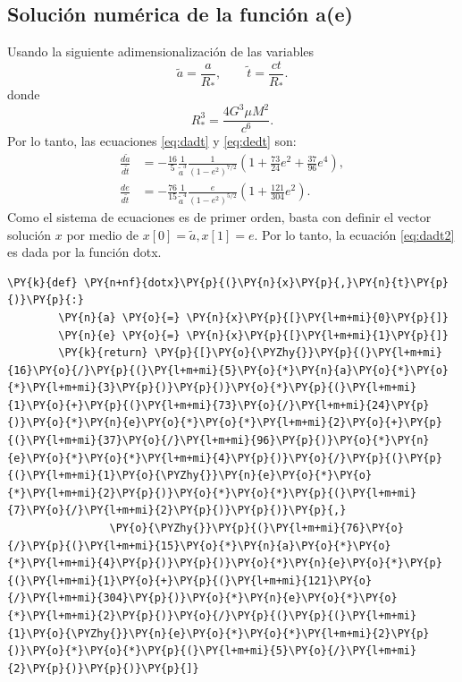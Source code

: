 \subsection{Solución numérica de la función a(e)}
Usando la siguiente adimensionalización \cite{Vito2008,Gonzalez2018,Gonz2019} de las variables
\begin{equation*}
    \tilde{a}= \frac{a}{R_*}, \qquad  \tilde{t}=\frac{ct}{R_*}.
\end{equation*}
donde
\begin{equation*}
    R_*^3 = \frac{4G^3\mu M^2}{c^6}.
\end{equation*}
Por lo tanto, las ecuaciones \ref{eq:dadt} y \ref{eq:dedt} son:
\begin{align}
    \label{eq:dadt2}
    \frac{d\tilde{a}}{d\tilde{t}} &= -\frac{16}{5}\frac{1}{\tilde{a}^3}\frac{1}{\left(1-e^2\right)^{7/2}}\left(1+\frac{73}{24}e^2+\frac{37}{96}e^4\right) ,\\
    \label{eq:dedt2}
\frac{de}{d\tilde{t}} &= -\frac{76}{15}\frac{1}{\tilde{a}^4}\frac{e}{\left(1-e^2\right)^{5/2}}\left(1+\frac{121}{304}e^2\right) .
\end{align}
Como el sistema de ecuaciones es de primer orden, basta con definir el vector solución $x$ por medio de $x[0]=\tilde{a}, x[1]=e$. Por lo tanto, 
la ecuación \ref{eq:dadt2} es dada por la función \textcolor{def}{dotx}.
\begin{tcolorbox}[breakable, size=fbox, boxrule=1pt, pad at break*=1mm,colback=cellbackground, colframe=cellborder]
    \begin{Verbatim}[commandchars=\\\{\}]
    \PY{k}{def} \PY{n+nf}{dotx}\PY{p}{(}\PY{n}{x}\PY{p}{,}\PY{n}{t}\PY{p}{)}\PY{p}{:}
        \PY{n}{a} \PY{o}{=} \PY{n}{x}\PY{p}{[}\PY{l+m+mi}{0}\PY{p}{]}
        \PY{n}{e} \PY{o}{=} \PY{n}{x}\PY{p}{[}\PY{l+m+mi}{1}\PY{p}{]}
        \PY{k}{return} \PY{p}{[}\PY{o}{\PYZhy{}}\PY{p}{(}\PY{l+m+mi}{16}\PY{o}{/}\PY{p}{(}\PY{l+m+mi}{5}\PY{o}{*}\PY{n}{a}\PY{o}{*}\PY{o}{*}\PY{l+m+mi}{3}\PY{p}{)}\PY{p}{)}\PY{o}{*}\PY{p}{(}\PY{l+m+mi}{1}\PY{o}{+}\PY{p}{(}\PY{l+m+mi}{73}\PY{o}{/}\PY{l+m+mi}{24}\PY{p}{)}\PY{o}{*}\PY{n}{e}\PY{o}{*}\PY{o}{*}\PY{l+m+mi}{2}\PY{o}{+}\PY{p}{(}\PY{l+m+mi}{37}\PY{o}{/}\PY{l+m+mi}{96}\PY{p}{)}\PY{o}{*}\PY{n}{e}\PY{o}{*}\PY{o}{*}\PY{l+m+mi}{4}\PY{p}{)}\PY{o}{/}\PY{p}{(}\PY{p}{(}\PY{l+m+mi}{1}\PY{o}{\PYZhy{}}\PY{n}{e}\PY{o}{*}\PY{o}{*}\PY{l+m+mi}{2}\PY{p}{)}\PY{o}{*}\PY{o}{*}\PY{p}{(}\PY{l+m+mi}{7}\PY{o}{/}\PY{l+m+mi}{2}\PY{p}{)}\PY{p}{)}\PY{p}{,}
                \PY{o}{\PYZhy{}}\PY{p}{(}\PY{l+m+mi}{76}\PY{o}{/}\PY{p}{(}\PY{l+m+mi}{15}\PY{o}{*}\PY{n}{a}\PY{o}{*}\PY{o}{*}\PY{l+m+mi}{4}\PY{p}{)}\PY{p}{)}\PY{o}{*}\PY{n}{e}\PY{o}{*}\PY{p}{(}\PY{l+m+mi}{1}\PY{o}{+}\PY{p}{(}\PY{l+m+mi}{121}\PY{o}{/}\PY{l+m+mi}{304}\PY{p}{)}\PY{o}{*}\PY{n}{e}\PY{o}{*}\PY{o}{*}\PY{l+m+mi}{2}\PY{p}{)}\PY{o}{/}\PY{p}{(}\PY{p}{(}\PY{l+m+mi}{1}\PY{o}{\PYZhy{}}\PY{n}{e}\PY{o}{*}\PY{o}{*}\PY{l+m+mi}{2}\PY{p}{)}\PY{o}{*}\PY{o}{*}\PY{p}{(}\PY{l+m+mi}{5}\PY{o}{/}\PY{l+m+mi}{2}\PY{p}{)}\PY{p}{)}\PY{p}{]}
    \end{Verbatim}
    \end{tcolorbox}
